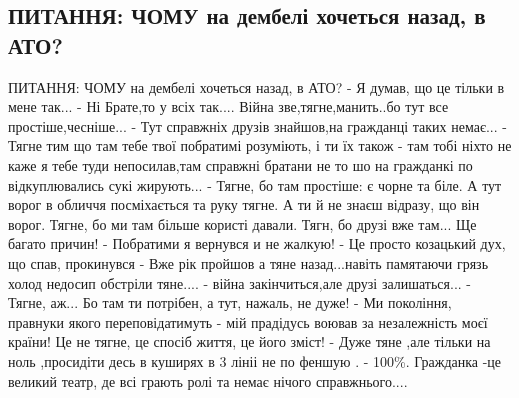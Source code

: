  
 


\subsection{ПИТАННЯ: ЧОМУ на дембелі хочеться назад, в АТО? }
\label{sec:13_10_2020.fb.sanya_bilalov.1_ato}

ПИТАННЯ: ЧОМУ на дембелі хочеться назад, в АТО? 
- Я думав, що це тільки в мене так... 
- Ні Брате,то у всіх так.... Війна зве,тягне,манить..бо тут все простіше,чесніше... 
- Тут справжніх друзів знайшов,на гражданці таких немає... 
- Тягне тим що там тебе твої побратимі розуміють, і ти їх також 
- там тобі ніхто не каже я тебе туди непосилав,там справжні братани не то шо на гражданкі по відкуплювались сукі жирують... 
- Тягне, бо там простіше: є чорне та біле. А тут ворог в обличчя посміхається та руку тягне. А ти й не знаєш відразу, що він ворог. Тягне, бо ми там більше користі давали. Тягн, бо друзі вже там... Ще багато причин! 
- Побратими я вернувся и не жалкую! 
- Це просто козацький дух, що спав, прокинувся 
- Вже рік пройшов а тяне назад...навіть памятаючи грязь холод недосип обстріли тяне.... 
- війна закінчиться,але друзі залишаться... 
- Тягне, аж... Бо там ти потрібен, а тут, нажаль, не дуже! 
- Ми покоління, правнуки якого переповідатимуть - мій прадідусь воював за незалежність моєї країни! Це не тягне, це спосіб життя, це його зміст! 
- Дуже тяне ,але тільки на ноль ,просидіти десь в куширях в 3 лініі не по феншую . 
- 100\%. Гражданка -це великий театр, де всі грають ролі та немає нічого справжнього....

